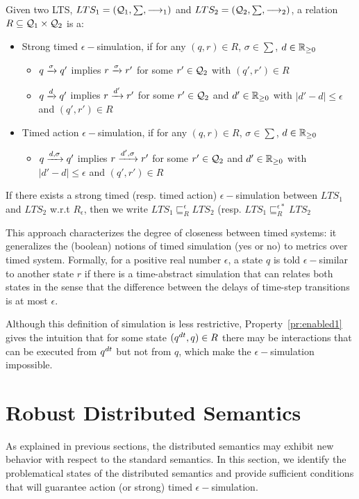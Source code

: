 \begin{definition}\label{def:esim}
  Given two LTS, $LTS_1=(\mathcal{Q}_1,\sum,\longrightarrow_{1})$ and $LTS_2=(\mathcal{Q}_2,\sum,\longrightarrow_{2})$, a relation $R\subseteq\mathcal{Q}_1\times\mathcal{Q}_2$ is a:
  \begin{itemize}
    \item Strong timed $\epsilon-$simulation, if for any $(q,r)\in R$, $\sigma\in\sum$, $d\in\mathbb{R}_{\ge 0}$
    \begin{itemize}
      \item $q\xrightarrow{\sigma}q'$ implies $r\xrightarrow{\sigma}r'$ for some $r'\in\mathcal{Q}_2$ with $(q',r')\in R$
      \item $q\xrightarrow{d}q'$ implies $r\xrightarrow{d'}r'$ for some $r'\in\mathcal{Q}_2$ and $d'\in\mathbb{R}_{\ge 0}$ with $|d'-d|\le\epsilon$ and $(q',r')\in R$
    \end{itemize}
    \item Timed action $\epsilon-$simulation, if for any $(q,r)\in R$, $\sigma\in\sum$, $d\in\mathbb{R}_{\ge 0}$
    \begin{itemize}
      \item $q\xrightarrow{d,\sigma}q'$ implies $r\xrightarrow{d',\sigma}r'$ for some $r'\in\mathcal{Q}_2$ and $d'\in\mathbb{R}_{\ge 0}$ 
        with $|d'-d|\le\epsilon$ and $(q',r')\in R$
    \end{itemize}
  \end{itemize}
  If there exists a strong timed (resp. timed action) $\epsilon-$simulation
  between $LTS_1$ and $LTS_2$ w.r.t $R_{\epsilon}$, then we write
  $LTS_1\sqsubseteq^{\epsilon}_{R}LTS_2$ (resp.
$LTS_1\sqsubseteq^{\epsilon*}_{R}LTS_2$
\end{definition}


This approach characterizes
the degree of closeness between timed systems: it generalizes the (boolean) 
notions of timed simulation
(yes or no) to metrics over timed system. Formally, for a positive real number
$\epsilon$, a state $q$ is 
told $\epsilon-$similar to another state $r$ if there is a time-abstract simulation 
that can relates both states in
the sense that the difference between the delays of time-step transitions is at most $\epsilon$.

Although this definition of simulation is less 
restrictive, Property~\ref{pr:enabled1} gives the intuition that for some state
$(q^{dt},q)\in R$ there may be interactions that can be executed from $q^{dt}$ but not from
$q$, which make the $\epsilon-$simulation impossible.
\section{Robust Distributed Semantics}
\label{sec:4}
As explained in previous sections, the distributed semantics may 
exhibit new behavior with respect to the standard semantics.  
In this section, we identify the problematical states of the 
distributed semantics and provide sufficient conditions
that will guarantee action (or strong) timed $\epsilon-$simulation. 

